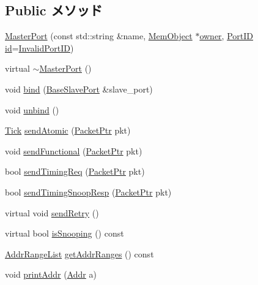 \subsection*{Public メソッド}
\begin{DoxyCompactItemize}
\item 
\hyperlink{classMasterPort_a4a4ccf1d4533ae4ce5ac9bf88a7edfd5}{MasterPort} (const std::string \&name, \hyperlink{classMemObject}{MemObject} $\ast$\hyperlink{classPort_aba966efb6c1df4b015be3a396df6c318}{owner}, \hyperlink{base_2types_8hh_acef4d7d41cb21fdc252e20c04cd7bb8e}{PortID} \hyperlink{classPort_a0a67444fc1c33a60fe4a92bfff05d0cb}{id}=\hyperlink{base_2types_8hh_a65bf40f138cf863f0c5e2d8ca1144126}{InvalidPortID})
\item 
virtual \hyperlink{classMasterPort_a5e846fe2c65dea8caa0c62564ce24f9f}{$\sim$MasterPort} ()
\item 
void \hyperlink{classMasterPort_a5035def22faf23d50855716f8c9602e2}{bind} (\hyperlink{classBaseSlavePort}{BaseSlavePort} \&slave\_\-port)
\item 
void \hyperlink{classMasterPort_af294915156f1e30f1d2e574dccc87945}{unbind} ()
\item 
\hyperlink{base_2types_8hh_a5c8ed81b7d238c9083e1037ba6d61643}{Tick} \hyperlink{classMasterPort_a49fe5ebde5a0349bff76527b969b7643}{sendAtomic} (\hyperlink{classPacket}{PacketPtr} pkt)
\item 
void \hyperlink{classMasterPort_aef8a57d30c0da6a2d2a599a14a9b8751}{sendFunctional} (\hyperlink{classPacket}{PacketPtr} pkt)
\item 
bool \hyperlink{classMasterPort_aafaf979005392447714384794f1a8610}{sendTimingReq} (\hyperlink{classPacket}{PacketPtr} pkt)
\item 
bool \hyperlink{classMasterPort_a4853cc2d61a4dee331dfaeaa54f64fcb}{sendTimingSnoopResp} (\hyperlink{classPacket}{PacketPtr} pkt)
\item 
virtual void \hyperlink{classMasterPort_a6172657b944e32a722d90a20c5896bb7}{sendRetry} ()
\item 
virtual bool \hyperlink{classMasterPort_a32602a6a3c3d66a639455036d6c08dd6}{isSnooping} () const 
\item 
\hyperlink{classstd_1_1list}{AddrRangeList} \hyperlink{classMasterPort_a36cf113d5e5e091ebddb32306c098fae}{getAddrRanges} () const 
\item 
void \hyperlink{classMasterPort_a88aa41e2693dd0091afae2604eba9bed}{printAddr} (\hyperlink{base_2types_8hh_af1bb03d6a4ee096394a6749f0a169232}{Addr} a)
\end{DoxyCompactItemize}
